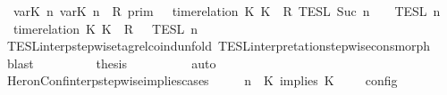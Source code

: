 \begin{isabellebody}
\ {\isacartoucheopen}{\isasymlbrakk}\ {\isasymlfloor}{\isasymtau}\isactrlsub v\isactrlsub a\isactrlsub r{\isacharparenleft}K\ n{\isacharparenright}{\isacharcomma}\ {\isasymtau}\isactrlsub v\isactrlsub a\isactrlsub r{\isacharparenleft}K\ n{\isacharparenright}{\isasymrfloor}\ {\isasymin}\ R\ {\isasymrbrakk}\isactrlsub p\isactrlsub r\isactrlsub i\isactrlsub m\ {\isasyminter}\ {\isasymlbrakk}\ time{\isacharminus}relation\ {\isasymlfloor}K\ K\ {\isasymin}\ R\ {\isasymrbrakk}\isactrlsub T\isactrlsub E\isactrlsub S\isactrlsub L\isactrlbsup {\isasymge}\ Suc\ n\isactrlesup \ {\isasyminter}\ {\isasymlbrakk}{\isasymlbrakk}\ {\isasymPsi}\ {\isasymrbrakk}{\isasymrbrakk}\isactrlsub T\isactrlsub E\isactrlsub S\isactrlsub L\isactrlbsup {\isasymge}\ n\isactrlesup \ {\isacharequal}\ {\isasymlbrakk}{\isasymlbrakk}\ {\isacharparenleft}time{\isacharminus}relation\ {\isasymlfloor}K\ K\ {\isasymin}\ R{\isacharparenright}\ {\isacharhash}\ {\isasymPsi}\ {\isasymrbrakk}{\isasymrbrakk}\isactrlsub T\isactrlsub E\isactrlsub S\isactrlsub L\isactrlbsup {\isasymge}\ n\isactrlesup {\isacartoucheclose}\isanewline
\ \ \ \ \ \ \ \ \isamarkupfalse%
\ TESL{\isacharunderscore}interp{\isacharunderscore}stepwise{\isacharunderscore}tagrel{\isacharunderscore}coind{\isacharunderscore}unfold\ TESL{\isacharunderscore}interpretation{\isacharunderscore}stepwise{\isacharunderscore}cons{\isacharunderscore}morph\ \isamarkupfalse%
\ blast\isanewline
\ \ \ \ \ \ \isamarkupfalse%
\ \isamarkupfalse%
\ {\isacharquery}thesis\isanewline
\ \ \ \ \ \ \ \ \isamarkupfalse%
\ auto\isanewline
\ \ \ \ \isamarkupfalse%
\isanewline
\ \ \isamarkupfalse%
%
\endisatagproof
{\isafoldproof}%
%
\isadelimproof
\isanewline
%
\endisadelimproof
\isanewline
{}\isamarkupfalse%
\ HeronConf{\isacharunderscore}interp{\isacharunderscore}stepwise{\isacharunderscore}implies{\isacharunderscore}cases{\isacharcolon}\isanewline
\ \ \ {\isacartoucheopen}{\isasymlbrakk}\ {\isasymGamma}{\isacharcomma}\ n\ {\isasymturnstile}\ {\isacharparenleft}{\isacharparenleft}K\ implies\ K\ {\isacharhash}\ {\isasymPsi}{\isacharparenright}\ {\isasymtriangleright}\ {\isasymPhi}\ {\isasymrbrakk}\isactrlsub c\isactrlsub o\isactrlsub n\isactrlsub f\isactrlsub i\isactrlsub g\isanewline

\end{isabellebody}
